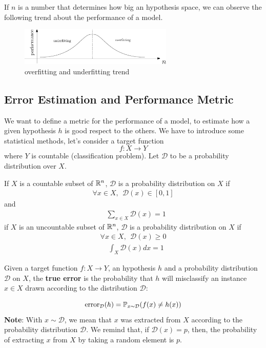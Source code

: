 \documentclass[10pt, letterpaper]{report}
\begin{document}
If $n$ is a number that determines how big an hypothesis space, we can observe the following trend about the performance of a model.

\begin{figure}[h!]
	\centering
	\includegraphics[width=0.65\textwidth]{images/fitting.eps}
	\caption{overfitting and underfitting trend}
	\label{img:fitting_trend}
\end{figure}

\subsection{Error Estimation and Performance Metric}
We want to define a metric for the performance of a model, to estimate how a given hypothesis $h$ is good respect to the others. We have to introduce some statistical methods, let's consider a target function\begin{equation}
	f:X\rightarrow Y
\end{equation}
where $Y$ is countable (classification problem). Let $\mathcal D$ to be a probability distribution over $X$.
\begin{definition}\label{def:prob_distr}
	If $X$ is a countable subset of ${\mathbb R}^n$, $\mathcal D$ is a probability distribution on $X$ if\begin{eqnarray}
		\forall x\in X, \ \ \mathcal D(x)\in [0,1]
	\end{eqnarray}
	and \begin{align*}
		 & \sum_{x\in X}\mathcal D(x)=1
	\end{align*}
	if $X$ is an uncountable subset of ${\mathbb R}^n$,  $\mathcal D$ is a probability distribution on $X$ if \begin{eqnarray}
		\forall x\in X, \ \ \mathcal D(x)\ge 0
	\end{eqnarray}
	\begin{align*}
		 & \int_X\mathcal D(x)dx=1
	\end{align*}
\end{definition}
\begin{definition}
	Given a target function $f:X\rightarrow Y$, an hypothesis $h$ and a probability distribution $\mathcal D$ on $X$, the \textbf{true error} is the probability that $h$ will misclassify an instance $x\in X$ drawn according to the distribution $\mathcal D$:
\end{definition}
\begin{equation}
	\text{error}_{\mathcal D}(h)=
	{\mathbb P}_{x\sim \mathcal D}
	(f(x)\ne h(x))
\end{equation}
\textbf{Note}: With $x\sim \mathcal D$, we mean that $x$ was extracted from $X$ according to the probability distribution $\mathcal D$. We remind that, if $\mathcal D(x)=p$, then, the probability of extracting $x$ from $X$ by taking a random element is $p$.\bigskip
\end{document}
